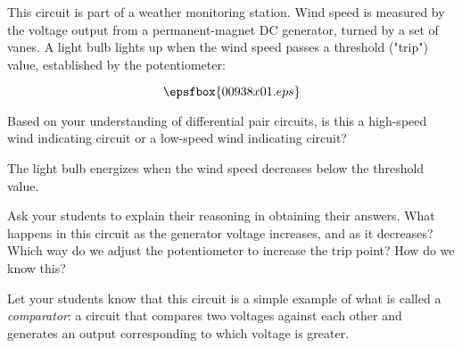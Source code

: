 

This circuit is part of a weather monitoring station.  Wind speed is measured by the voltage output from a permanent-magnet DC generator, turned by a set of vanes.  A light bulb lights up when the wind speed passes a threshold ("trip") value, established by the potentiometer:

$$\epsfbox{00938x01.eps}$$

Based on your understanding of differential pair circuits, is this a high-speed wind indicating circuit or a low-speed wind indicating circuit?







The light bulb energizes when the wind speed decreases below the threshold value.







Ask your students to explain their reasoning in obtaining their answers.  What happens in this circuit as the generator voltage increases, and as it decreases?  Which way do we adjust the potentiometer to increase the trip point?  How do we know this?

Let your students know that this circuit is a simple example of what is called a {\it comparator}: a circuit that compares two voltages against each other and generates an output corresponding to which voltage is greater.




